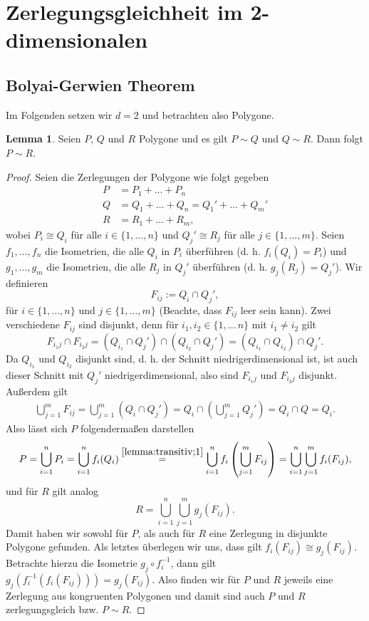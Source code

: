 \documentclass[11pt,titlepage]{article}
\theoremstyle{definition}
\newtheorem{lemma}[theorem]{Lemma}
\theoremstyle{remark}
\begin{document}
	\newpage
	
	\section{Zerlegungsgleichheit im 2-dimensionalen}
	
	\subsection{Bolyai-Gerwien Theorem}
	
	Im Folgenden setzen wir $d=2$ und betrachten also Polygone.
	
	\begin{lemma} \label{lemma:transitiv}
		Seien $P$, $Q$ und $R$ Polygone und es gilt $P\sim Q$ und $Q\sim R$. Dann folgt $P\sim R$.
	\end{lemma}
	
	\begin{proof}
		Seien die Zerlegungen der Polygone wie folgt gegeben
		\begin{align*}
			P &= P_1+\ldots+P_n \\
			Q &= Q_1+\ldots+Q_n = Q_1'+\ldots+Q_m' \\
			R &= R_1+\ldots+R_m,
		\end{align*}
		wobei $P_i\cong Q_i$ für alle $i\in\{1,\ldots,n\}$ und $Q_j'\cong R_j$ für alle $j\in\{1,\ldots,m\}$. 
		Seien $f_1,\ldots,f_n$ die Isometrien, die alle $Q_i$ in $P_i$ überführen (d. h. $f_i(Q_i)=P_i$) und 
		$g_1,\ldots,g_m$ die Isometrien, die alle $R_j$ in $Q_j'$ überführen (d. h. $g_j(R_j)=Q_j'$).
		Wir definieren
		\[ F_{ij}:=Q_i\cap Q_j',\]
		für $i\in\{1,\ldots,n\}$ und $j\in\{1,\ldots,m\}$ (Beachte, dass $F_{ij}$ leer sein kann). Zwei verschiedene 
		$F_{ij}$ sind disjunkt, denn für $i_1,i_2\in\{1,\ldots\,n\}$ mit $i_1\neq i_2$ gilt 
		\[F_{i_1 j}\cap F_{i_2 j}=(Q_{i_1}\cap Q_j')\cap(Q_{i_2}\cap Q_j')=(Q_{i_1}\cap Q_{i_2})\cap Q_j'.\] 
		Da $Q_{i_1}$ und $Q_{i_2}$ disjunkt sind, d. h. der Schnitt niedrigerdimensional ist, ist 
		auch dieser Schnitt mit $Q_j'$ niedrigerdimensional, also sind $F_{i_1j}$ und $F_{i_2j}$ disjunkt. Außerdem gilt
		\begin{align}
			\bigcup_{j=1}^m F_{ij} = \bigcup_{j=1}^m \left( Q_i \cap Q_j' \right) = 
			Q_i \cap \left( \bigcup_{j=1}^m Q_j' \right)=Q_i \cap Q = Q_i. \label{lemma:transitiv;1}
		\end{align}
		Also lässt sich $P$ folgendermaßen darstellen
		\[ P=\bigcup_{i=1}^n P_i = \bigcup_{i=1}^n f_i(Q_i) \overset{\ref{lemma:transitiv;1}}{=}\bigcup_{i=1}^n f_i 
		\left(\bigcup_{j=1}^m F_{ij} \right) =
		\bigcup_{i=1}^n \bigcup_{j=1}^m f_i(F_{ij}), \]
		und für $R$ gilt analog
		\[ R=\bigcup_{i=1}^n \bigcup_{j=1}^m g_j(F_{ij}). \]
		Damit haben wir sowohl für $P$, als auch für $R$ eine Zerlegung in disjunkte Polygone 
		gefunden. Als letztes überlegen wir uns, dass gilt $f_i(F_{ij})\cong g_j(F_{ij})$. Betrachte hierzu die Isometrie 
		$g_j\circ f_i^{-1}$, dann gilt $g_j(f_i^{-1}(f_i(F_{ij})))=g_j(F_{ij})$. Also finden wir für $P$ und $R$ jeweils eine 
		Zerlegung aus kongruenten Polygonen und damit sind auch $P$ und $R$ zerlegungsgleich bzw. $P\sim R$.
	\end{proof}
	
\end{document}
